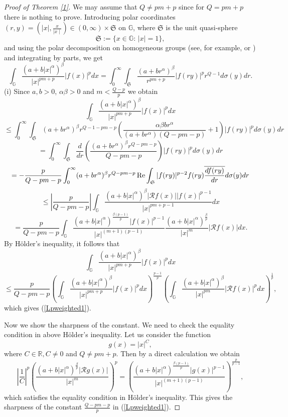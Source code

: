 \documentclass[a4paper,12pt,reqno]{amsart}
\renewcommand\eqref[1]{(\ref{#1})} %
\numberwithin{equation}{section}
\theoremstyle{plain}
\theoremstyle{definition}
\renewcommand{\wp}{\mathfrak S}
\begin{document}
\begin{proof}[Proof of Theorem \ref{1}] We may assume that $Q\neq pm+p$ since for $Q=pm+p$ there is nothing
to prove. Introducing polar coordinates $(r,y)=(|x|, \frac{x}{\mid x\mid})\in (0,\infty)\times\wp$ on $\mathbb{G}$, where $\wp$ is the
unit quasi-sphere
\begin{equation}\label{EQ:sphere}
\wp:=\{x\in \mathbb{G}:\,|x|=1\},
\end{equation} and using the polar decomposition on homogeneous groups (see, for example, \cite{FS-Hardy} or \cite{FR}) and integrating by parts, we get
\begin{equation}\label{eqp}
\int_{\mathbb{G}}
\frac{(a+b|x|^{\alpha})^{\beta}}{|x|^{pm+p}}|f(x)|^{p}dx
=\int_{0}^{\infty}\int_{\wp}
\frac{(a+br^{\alpha})^{\beta}}{r^{pm+p}}|f(ry)|^{p} r^{Q-1}d\sigma(y)dr.
\end{equation}
(i) Since $a,b>0$, $\alpha \beta>0$ and $m<\frac{Q-p}{p}$ we obtain
$$
\int_{\mathbb{G}}
\frac{(a+b|x|^{\alpha})^{\beta}}{|x|^{pm+p}}|f(x)|^{p}dx$$
$$\leq\int_{0}^{\infty}\int_{\wp}
(a+br^{\alpha})^{\beta}r^{Q-1-pm-p}\left(\frac{\alpha\beta b r^{\alpha}}{(a+br^{\alpha})(Q-pm-p)}+1\right)|f(ry)|^{p} d\sigma(y)dr
$$
$$=\int_{0}^{\infty}\int_{\wp}
\frac{d}{dr}\left(\frac{(a+br^{\alpha})^{\beta}r^{Q-pm-p}}{Q-pm-p}\right)|f(ry)|^{p} d\sigma(y)dr$$
$$
=-\frac{p}{Q-pm-p}\int_{0}^{\infty}(a+br^{\alpha})^{\beta}r^{Q-pm-p}  \,{\rm Re}\int_{\wp}
|f(ry)|^{p-2} f(ry) \overline{\frac{df(ry)}{dr}}d\sigma(y)dr
$$
$$\leq \left|\frac{p}{Q-pm-p}\right|\int_{\mathbb{G}}\frac{(a+b|x|^{\alpha})^{\beta}|\mathcal{R}f(x)||f(x)|^{p-1}}{|x|^{pm+p-1}}dx
$$
$$=\frac{p}{Q-pm-p}
\int_{\mathbb{G}}\frac{(a+b|x|^{\alpha})^
{\frac{\beta(p-1)}{p}}|f(x)|^{p-1}}{|x|^{(m+1)(p-1)}}
\frac{(a+b|x|^{\alpha})^
{\frac{\beta}{p}}}{|x|^{m}}|\mathcal{R}f(x)|dx.$$
By H\"{o}lder's inequality, it follows that
$$
\int_{\mathbb{G}}
\frac{(a+b|x|^{\alpha})^{\beta}}{|x|^{pm+p}}|f(x)|^{p}dx$$
$$\leq\frac{p}{Q-pm-p}\left(\int_{\mathbb{G}}\frac{(a+b|x|^{\alpha})^{\beta}}{|x|^{pm+p}}|f(x)|^{p}dx\right)^\frac{p-1}{p}
\left(\int_{\mathbb{G}}\frac{(a+b|x|^{\alpha})^{\beta}}{|x|^{pm}}|\mathcal{R}f(x)|^{p}dx\right)^\frac{1}{p},
$$
which gives \eqref{Lpweighted1}.

Now we show the sharpness of the constant. We need to check the equality
condition in above H\"older's inequality.
Let us consider the function
$$g(x)=|x|^{C}, $$
where $C\in\mathbb{R}, C\neq 0$ and $Q\neq pm+p$. Then by a direct calculation we obtain
\begin{equation}\label{Holder_eq1}
\left|\frac{1}{C}\right|^{p}\left(\frac{(a+b|x|^{\alpha})^
{\frac{\beta}{p}}|\mathcal{R}g(x)|}{|x|^{m}}\right)^{p}=\left(\frac{(a+b|x|^{\alpha})^
{\frac{\beta(p-1)}{p}}|g(x)|^{p-1}}
{|x|^{(m+1) (p-1)}}\right)^{\frac{p}{p-1}},
\end{equation}
which satisfies the equality condition in H\"older's inequality.
This gives the sharpness of the constant $\frac{Q-pm-p}{p}$ in \eqref{Lpweighted1}.


\end{proof}
\end{document}
